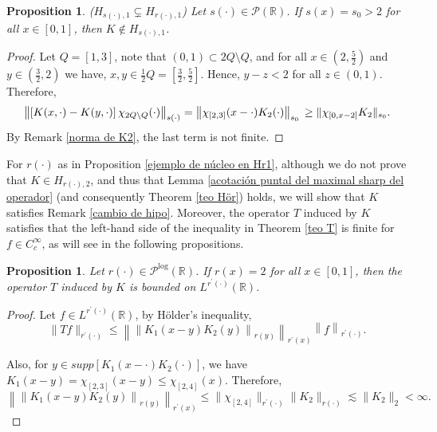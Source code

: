 \documentclass[a4paper,11pt,reqno]{amsart}
\theoremstyle{plain}
\numberwithin{equation}{section}
\newtheorem{propo}[teo]{Proposition}
\theoremstyle{definition}
\begin{document}
\begin{propo}($H_{{s(\cdot)},1}\varsubsetneq H_{{r(\cdot)},1}$) Let $s(\cdot)\in\mathcal{P} (\mathbb{R})$. If $s(x)=s_0>2$ for all $x\in[0,1]$, then $K\notin H_{s(\cdot),1}$.
	
\end{propo}
\begin{proof}
	Let $Q=[1,3]$, note that $(0,1)\subset2Q\setminus Q$, and for all $x\in\left(2,\frac{5}{2}\right)$ and $y\in\left(\frac{3}{2},2\right)$  we have,  $x,y\in\frac{1}{2}Q=\left[\frac{3}{2},\frac{5}{2}\right]$. Hence, $y-z<2$ for all $z\in (0,1)$. Therefore,
	\begin{equation*}
	\left\|\left[K(x,\cdot)-K(y,\cdot)\right]\chi_{2Q\setminus Q}(\cdot)\right\|_{s(\cdot)}
	=\left\|\chi_{[2,3]}(x-\cdot)K_2(\cdot)\right\|_{s_0}\\
	\geq\|\chi_{[0,x-2]}K_2 \|_{s_0}.
	\end{equation*}
	By Remark \ref{norma de K2}, the last term is not finite.
\end{proof}


For $r(\cdot)$ as in Proposition \ref{ejemplo de núcleo en Hr1}, although we do not prove that $K \in H_{r(\cdot),2}$, and thus that Lemma \ref{acotación puntal del maximal sharp del operador} (and consequently Theorem \ref{teo Hör}) holds, we will show that $K$ satisfies Remark \ref{cambio de hipo}. Moreover, the operator $T$ induced by $K$ satisfies that the left-hand side of the inequality in Theorem \ref{teo T} is finite for $f \in C_c^\infty$, as will see in the following propositions.

\begin{propo}\label{fuerte rprima}
	Let $r(\cdot)\in \mathcal{P}^{\log}(\mathbb{R})$. If $r(x)=2$ for all $x\in\left[0,1\right]$, then the operator $T$ induced by $K$ is bounded on $L^{r^\prime(\cdot)} (\mathbb{R})$.
	
	
\end{propo} 

\begin{proof}
	Let $f\in L^{r^\prime(\cdot)}(\mathbb{R})$, by Hölder's inequality,
	\begin{equation*}
	\|Tf\|_{r^\prime(\cdot)}\leq\left\| \left\|K_1(x-y)K_2(y) \right\|_{r(y)}\right\|_{r^\prime(x)}\left\|f\right\|_{r^\prime(\cdot)}.
	\end{equation*}
	
	Also, for $y\in supp[K_1(x-\cdot)K_2(\cdot)]$, we have $K_1(x-y)=\chi_{[2,3]}(x-y)\leq\chi_{[2,4]}(x)$. Therefore,
	\begin{equation*}
	\left\| \left\|K_1(x-y)K_2(y) \right\|_{r(y)}    \right\|_{r^\prime(x)}\leq\|\chi_{[2,4]}\|_{r^\prime(\cdot)}\|K_2\|_{r(\cdot)}\lesssim\|K_2\|_2<\infty.
	\end{equation*}
\end{proof}
\end{document}
